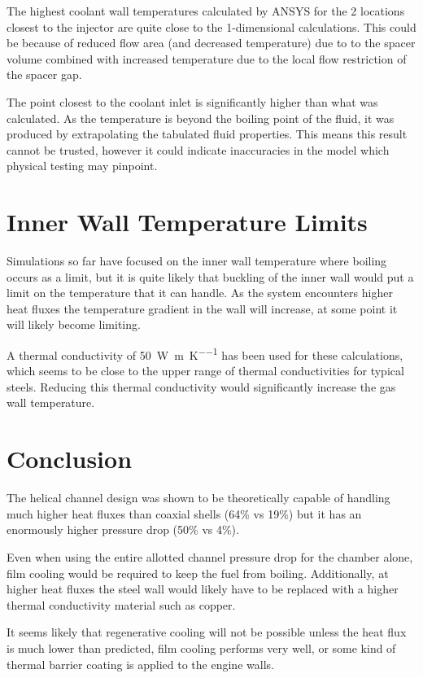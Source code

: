 \documentclass[11pt]{article}
\begin{document}
The highest coolant wall temperatures calculated by ANSYS for the 2 locations closest to the injector are quite close to the 1-dimensional calculations. This could be because of reduced flow area (and decreased temperature) due to to the spacer volume combined with increased temperature due to the local flow restriction of the spacer gap.

The point closest to the coolant inlet is significantly higher than what was calculated. As the temperature is beyond the boiling point of the fluid, it was produced by extrapolating the tabulated fluid properties. This means this result cannot be trusted, however it could indicate inaccuracies in the model which physical testing may pinpoint.

\section{Inner Wall Temperature Limits}

Simulations so far have focused on the inner wall temperature where boiling occurs as a limit, but it is quite likely that buckling of the inner wall would put a limit on the temperature that it can handle. As the system encounters higher heat fluxes the temperature gradient in the wall will increase, at some point it will likely become limiting.

A thermal conductivity of \SI{50}{\watt\per\meter\per\kelvin} has been used for these calculations, which seems to be close to the upper range of thermal conductivities for typical steels. Reducing this thermal conductivity would significantly increase the gas wall temperature.

\section{Conclusion}

The helical channel design was shown to be theoretically capable of handling much higher heat fluxes than coaxial shells (64\% vs 19\%) but it has an enormously higher pressure drop (50\% vs 4\%).

Even when using the entire allotted channel pressure drop for the chamber alone, film cooling would be required to keep the fuel from boiling. Additionally, at higher heat fluxes the steel wall would likely have to be replaced with a higher thermal conductivity material such as copper.

It seems likely that regenerative cooling will not be possible unless the heat flux is much lower than predicted, film cooling performs very well, or some kind of thermal barrier coating is applied to the engine walls.
\end{document}
